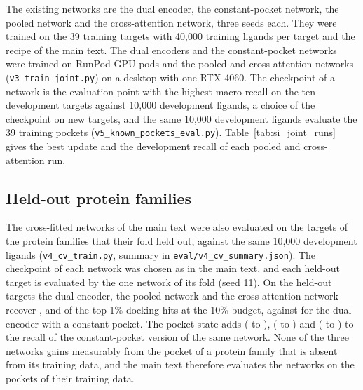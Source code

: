 \documentclass[journal=jcisd8,manuscript=article]{achemso}
\begin{document}
The existing networks are the dual encoder, the constant-pocket network, the pooled network and the cross-attention network, three seeds each. They were trained on the 39 training targets with 40{,}000 training ligands per target and the recipe of the main text. The dual encoders and the constant-pocket networks were trained on RunPod GPU pods and the pooled and cross-attention networks (\texttt{v3\_train\_joint.py}) on a desktop with one RTX 4060. The checkpoint of a network is the evaluation point with the highest macro recall on the ten development targets against 10{,}000 development ligands, a choice of the checkpoint on new targets, and the same 10{,}000 development ligands evaluate the 39 training pockets (\texttt{v5\_known\_pockets\_eval.py}). Table~\ref{tab:si_joint_runs} gives the best update and the development recall of each pooled and cross-attention run.

\subsection{Held-out protein families}

The cross-fitted networks of the main text were also evaluated on the targets of the protein families that their fold held out, against the same 10{,}000 development ligands (\texttt{v4\_cv\_train.py}, summary in \texttt{eval/v4\_cv\_summary.json}). The checkpoint of each network was chosen as in the main text, and each held-out target is evaluated by the one network of its fold (seed 11). On the \hoNTargets{} held-out targets the dual encoder, the pooled network and the cross-attention network recover \hoDualTen{}, \hoPooledTen{} and \hoXattnTen{} of the top-1\% docking hits at the 10\% budget, against \hoConstTen{} for the dual encoder with a constant pocket. The pocket state adds \hoGainDualTen{} (\hoGainDualTenLo{} to \hoGainDualTenHi{}), \hoGainPooledTen{} (\hoGainPooledTenLo{} to \hoGainPooledTenHi{}) and \hoGainXattnTen{} (\hoGainXattnTenLo{} to \hoGainXattnTenHi{}) to the recall of the constant-pocket version of the same network. None of the three networks gains measurably from the pocket of a protein family that is absent from its training data, and the main text therefore evaluates the networks on the pockets of their training data.









\clearpage

{\footnotesize}


\end{document}

